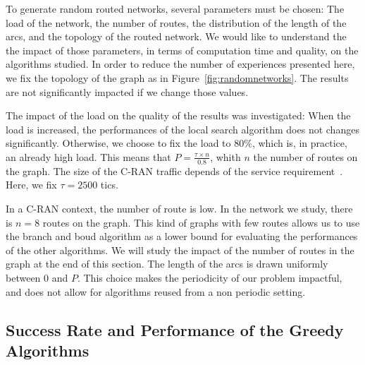 To generate random routed networks, several parameters must be chosen: The load of the network, the number of routes, the distribution of the length of the arcs, and the topology of the routed network. We would like to understand the the impact of those parameters, in terms of computation time and quality, on the algorithms studied. In order to reduce the number of experiences presented here, we fix the topology of the graph as in Figure~\ref{fig:randomnetworks}. The results are not significantly impacted if we change those values. 

 
 The impact of the load on the quality of the results was investigated: When the load is increased, the performances of the local search algorithm does not changes significantly. Otherwise, we choose to fix the load to $80\%$, which is, in practice, an already high load. This means that $P = \frac{\tau \times n}{0.8}$, whith $n$ the number of routes on the graph. The size of the C-RAN traffic depends of the service requirement~\cite{mobile2011c}. Here, we fix $\tau = 2500$ tics.
  
In a C-RAN context, the number of route is low. In the network we study, there is $n=8$ routes on the graph. This kind of graphs with few routes allows us to use the branch and boud algorithm as a lower bound for evaluating the performances of the other algorithms. We will study the impact of the number of routes in the graph at the end of this section. The length of the arcs is drawn uniformly between $0$ and $P$. This choice makes the periodicity of our problem impactful, and does not allow for algorithms reused from a non periodic setting.



\subsection{Success Rate and Performance of the Greedy Algorithms}



